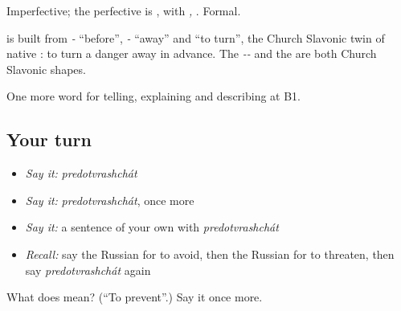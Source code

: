 Imperfective; the perfective is \emph{}, with \emph{, }. Formal.

\begin{cousinweb}
\textbf{} is built from \emph{-} \textquotedblleft{}before\textquotedblright{}, \emph{-} \textquotedblleft{}away\textquotedblright{} and \emph{} \textquotedblleft{}to turn\textquotedblright{}, the Church Slavonic twin of native \emph{}: to turn a danger away in advance. The \emph{--} and the \emph{} are both Church Slavonic shapes.
\end{cousinweb}

\begin{grammarlens}[title={What you've built}]
One more word for telling, explaining and describing at B1.
\end{grammarlens}

\subsection*{Your turn}
\begin{itemize}
\raggedright
  \item \emph{Say it:} \emph{predotvrashchát}
  \item \emph{Say it:} \emph{predotvrashchát}, once more
  \item \emph{Say it:} a sentence of your own with \emph{predotvrashchát}
  \item \emph{Recall:} say the Russian for to avoid, then the Russian for to threaten, then say \emph{predotvrashchát} again
\end{itemize}

\begin{tcolorbox}[breakable,colback=teal!4,colframe=teal!35!black,title={Before you move on}]
What does  mean? (\textquotedblleft{}To prevent\textquotedblright{}.) Say it once more.
\end{tcolorbox}
